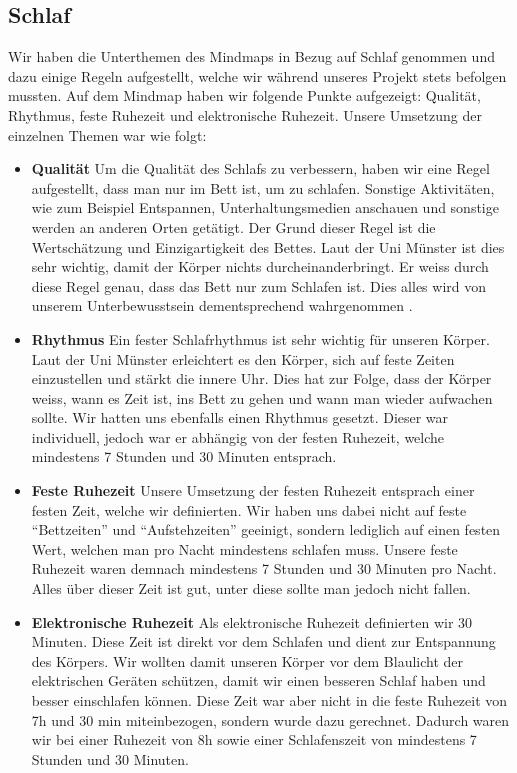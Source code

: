 \subsection{Schlaf}
\authortoc{\bastian}{\subsectionident}
Wir haben die Unterthemen des Mindmaps in Bezug auf Schlaf genommen und dazu einige Regeln aufgestellt, welche wir während unseres Projekt stets befolgen mussten.
\newline
Auf dem Mindmap haben wir folgende Punkte aufgezeigt: Qualität, Rhythmus, feste Ruhezeit und elektronische Ruhezeit. 
\newline
\newline
Unsere Umsetzung der einzelnen Themen war wie folgt:
\begin{itemize}
  \item \textbf{Qualität}
  \newline
  Um die Qualität des Schlafs zu verbessern, haben wir eine Regel aufgestellt, dass man nur im Bett ist, um zu schlafen. Sonstige Aktivitäten, wie zum Beispiel Entspannen, Unterhaltungsmedien anschauen und sonstige werden an anderen Orten getätigt. Der Grund dieser Regel ist die Wertschätzung und Einzigartigkeit des Bettes. Laut der Uni Münster ist dies sehr wichtig, damit der Körper nichts durcheinanderbringt. Er weiss durch diese Regel genau, dass das Bett nur zum Schlafen ist. Dies alles wird von unserem Unterbewusstsein dementsprechend wahrgenommen \cite{schlaf_regeln}.
  \item \textbf{Rhythmus}
  \newline
  Ein fester Schlafrhythmus ist sehr wichtig für unseren Körper. Laut der Uni Münster erleichtert es den Körper, sich auf feste Zeiten einzustellen und stärkt die innere Uhr. Dies hat zur Folge, dass der Körper weiss, wann es Zeit ist, ins Bett zu gehen und wann man wieder aufwachen sollte. Wir hatten uns ebenfalls einen Rhythmus gesetzt. Dieser war individuell, jedoch war er abhängig von der festen Ruhezeit, welche mindestens 7 Stunden und 30 Minuten entsprach.
  \item \textbf{Feste Ruhezeit}
  \newline
  Unsere Umsetzung der festen Ruhezeit entsprach einer festen Zeit, welche wir definierten. Wir haben uns dabei nicht auf feste “Bettzeiten” und “Aufstehzeiten” geeinigt, sondern lediglich auf einen festen Wert, welchen man pro Nacht mindestens schlafen muss. Unsere feste Ruhezeit waren demnach mindestens 7 Stunden und 30 Minuten pro Nacht. Alles über dieser Zeit ist gut, unter diese sollte man jedoch nicht fallen.
  \item \textbf{Elektronische Ruhezeit}
  \newline
  Als elektronische Ruhezeit definierten wir 30 Minuten. Diese Zeit ist direkt vor dem Schlafen und dient zur Entspannung des Körpers. Wir wollten damit unseren Körper vor dem Blaulicht der elektrischen Geräten schützen, damit wir einen besseren Schlaf haben und besser einschlafen können. Diese Zeit war aber nicht in die feste Ruhezeit von 7h und 30 min miteinbezogen, sondern wurde dazu gerechnet. Dadurch waren wir bei einer Ruhezeit von 8h sowie einer Schlafenszeit von mindestens 7 Stunden und 30 Minuten.
\end{itemize}
